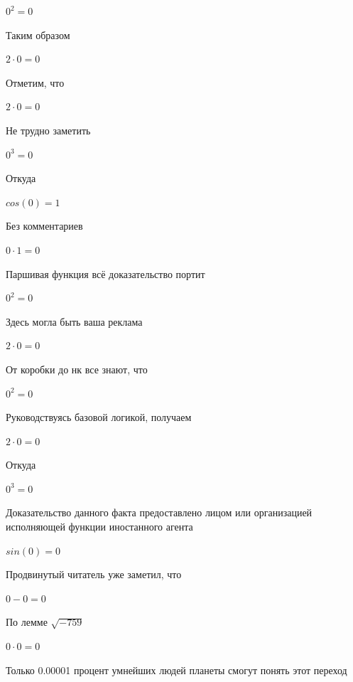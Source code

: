 \documentclass[12pt,a4paper,fleqn]{article}
\begin{document}
\begin{center}$0^{2} = 0$\end{center}
Таким образом

\begin{center}$2 \cdot 0 = 0$\end{center}
Отметим, что

\begin{center}$2 \cdot 0 = 0$\end{center}
Не трудно заметить

\begin{center}$0^{3} = 0$\end{center}
Откуда

\begin{center}$cos(0) = 1$\end{center}
Без комментариев\cite{link4}

\begin{center}$0 \cdot 1 = 0$\end{center}
Паршивая функция всё доказательство портит\cite{link2}

\begin{center}$0^{2} = 0$\end{center}
Здесь могла быть ваша реклама

\begin{center}$2 \cdot 0 = 0$\end{center}
От коробки до нк все знают, что

\begin{center}$0^{2} = 0$\end{center}
Руководствуясь базовой логикой, получаем

\begin{center}$2 \cdot 0 = 0$\end{center}
Откуда

\begin{center}$0^{3} = 0$\end{center}
Доказательство данного факта предоставлено лицом или организацией исполняющей функции иностанного агента

\begin{center}$sin(0) = 0$\end{center}
Продвинутый читатель уже заметил, что

\begin{center}$0-0 = 0$\end{center}
По лемме $\sqrt{-759}$
\begin{center}$0 \cdot 0 = 0$\end{center}
Только 0.00001 процент умнейших людей планеты смогут понять этот переход
\end{document}
